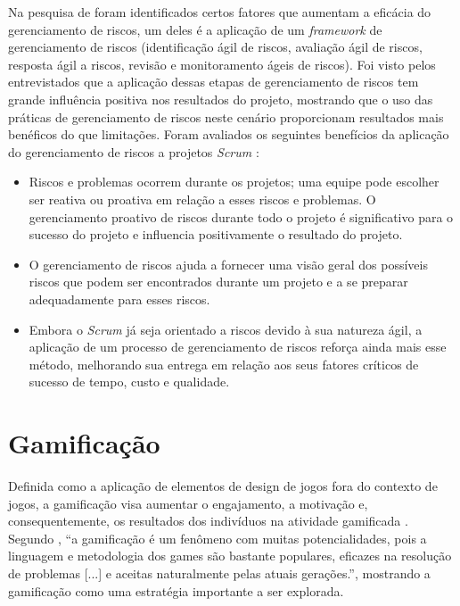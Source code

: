\documentclass[
	12pt,
	openright,
	twoside,
	a4paper,
	english,
	brazil
	]{abntex2}
\begin{document}
Na pesquisa de  foram identificados certos fatores que aumentam a eficácia do gerenciamento de riscos, um deles é a aplicação de um \textit{framework} de gerenciamento de riscos (identificação ágil de riscos, avaliação ágil de riscos, resposta ágil a riscos, revisão e monitoramento ágeis de riscos). Foi visto pelos entrevistados que a aplicação dessas etapas de gerenciamento de riscos tem grande influência positiva nos resultados do projeto, mostrando que o uso das práticas de gerenciamento de riscos neste cenário proporcionam resultados mais benéficos do que limitações. Foram avaliados os seguintes benefícios da aplicação do gerenciamento de riscos a projetos \textit{Scrum} \cite{Gold}:
\begin{itemize}
  \item Riscos e problemas ocorrem durante os projetos; uma equipe pode escolher ser reativa ou proativa em relação a esses riscos e problemas. O gerenciamento proativo de riscos durante todo o projeto é significativo para o sucesso do projeto e influencia positivamente o resultado do projeto.
  \item O gerenciamento de riscos ajuda a fornecer uma visão geral dos possíveis riscos que podem ser encontrados durante um projeto e a se preparar adequadamente para esses riscos.
  \item Embora o \textit{Scrum} já seja orientado a riscos devido à sua natureza ágil, a aplicação de um processo de gerenciamento de riscos reforça ainda mais esse método, melhorando sua entrega em relação aos seus fatores críticos de sucesso de tempo, custo e qualidade.
\end{itemize}


\section{Gamificação}

Definida como a aplicação de elementos de design de jogos fora do contexto de jogos, a gamificação visa aumentar o engajamento, a motivação e, consequentemente, os resultados dos indivíduos na atividade gamificada \cite{GARCIA201721}. Segundo , “a gamificação é um fenômeno com muitas potencialidades, pois a linguagem e metodologia dos games são bastante populares, eficazes na resolução de problemas [...] e aceitas naturalmente pelas atuais gerações.”, mostrando a gamificação como uma estratégia importante a ser explorada.
\end{document}
